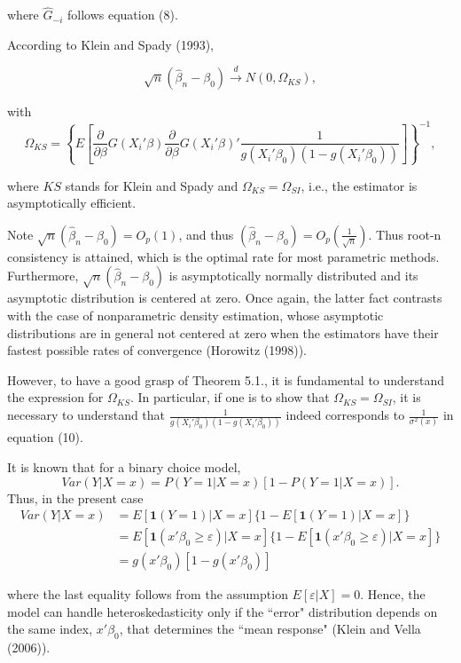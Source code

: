 \documentclass[a4paper]{article}
\begin{document}
where $\hat{G}_{-i}$ follows equation (8).

\begin{theorem}
According to Klein and Spady (1993), 

\[\sqrt{n}(\hat{\beta}_{n} - \beta_0) \stackrel{d}{\rightarrow} N(0,\Omega_{KS}),
\]

with  \[ \Omega_{KS} = \left\{ E\left[\frac{\partial}{\partial \beta}
 G(X_i'\beta)\frac{\partial}{\partial \beta} G(X_i'\beta)'\frac{1}{g(X_i'\beta_0)(1 - g(X_i'\beta_0))} \right]\right\}^{-1}, \]
 
where $KS$ stands for Klein and Spady and $\Omega_{KS} = \Omega_{SI}$, i.e., the estimator is asymptotically efficient.

\end{theorem}

Note $\sqrt{n}(\hat{\beta}_n - \beta_0)=O_p(1)$, and thus $(\hat{\beta}_n - \beta_0) = O_p\left(\frac{1}{\sqrt{n}}\right)$.  Thus root-n consistency is attained, which is the optimal rate for most parametric methods. Furthermore, $\sqrt{n}(\hat{\beta}_n - \beta_0)$ is asymptotically normally distributed and its asymptotic distribution is centered at zero. Once again, the latter fact contrasts with the case of nonparametric density estimation, whose asymptotic distributions are in general not centered at zero when the estimators have their fastest possible rates of convergence (Horowitz (1998)). 

However, to have a good grasp of Theorem 5.1., it is fundamental to understand the expression for $\Omega_{KS}$. In particular, if one is to show that $\Omega_{KS} = \Omega_{SI}$, it is necessary to understand that $\frac{1}{g(X_i'\beta_0)(1 - g(X_i'\beta_0))}$ indeed corresponds to $\frac{1}{\sigma^2(x)}$ in equation (10). 

It is known that for a binary choice model, 
\[Var(Y|X = x) = P(Y = 1|X = x)[1 - P(Y = 1|X = x)].\]
Thus, in the present case
\begin{align*}
Var(Y|X = x) & = E[\mathbf{1}{(Y = 1)}|X = x]\{1 - E[\mathbf{1}{(Y = 1)}|X = x]\} \\
&=E[\mathbf{1}{(x'\beta_0 \geq \varepsilon)}|X = x]\{1 - E[\mathbf{1}{(x'\beta_0 \geq \varepsilon)}|X = x]\} \\ 
& = g(x'\beta_0)[1 - g(x'\beta_0)]
\end{align*}

where the last equality follows from the assumption $E[\varepsilon|X]=0$. Hence, the model can handle heteroskedasticity only if the ``error" distribution depends on the same index, $ x'\beta_0$, that determines the ``mean response" (Klein and Vella (2006)).
\end{document}
